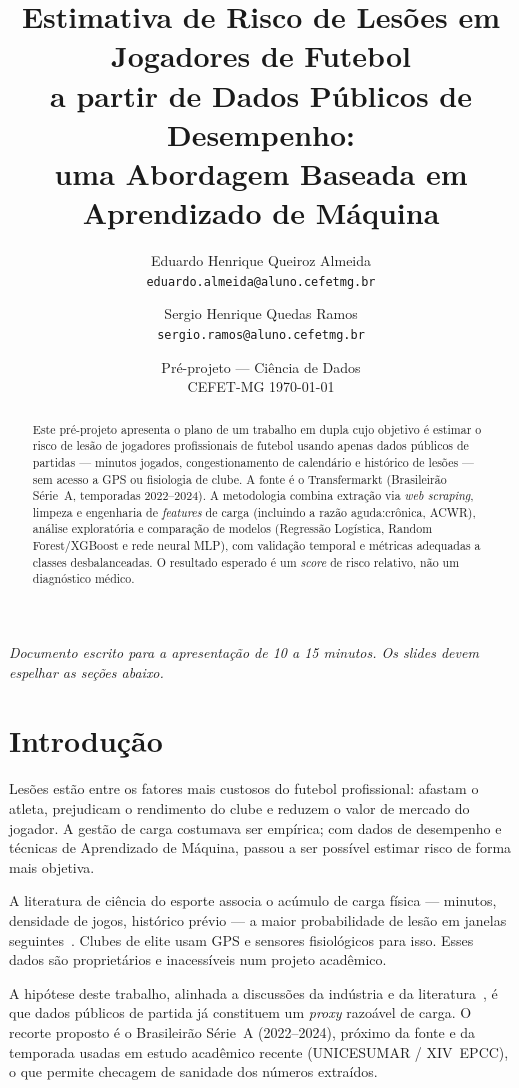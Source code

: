\documentclass[11pt,a4paper]{article}
\title{Estimativa de Risco de Lesões em Jogadores de Futebol\\
a partir de Dados Públicos de Desempenho:\\
uma Abordagem Baseada em Aprendizado de Máquina}
\author{Eduardo Henrique Queiroz Almeida\\
\texttt{eduardo.almeida@aluno.cefetmg.br}
\and
Sergio Henrique Quedas Ramos\\
\texttt{sergio.ramos@aluno.cefetmg.br}}
\date{Pré-projeto --- Ciência de Dados\\
CEFET-MG \quad \today}
\begin{document}
\maketitle

\begin{abstract}
\noindent
Este pré-projeto apresenta o plano de um trabalho em dupla cujo objetivo é estimar o risco de lesão de jogadores profissionais de futebol usando apenas dados públicos de partidas --- minutos jogados, congestionamento de calendário e histórico de lesões --- sem acesso a GPS ou fisiologia de clube. A fonte é o Transfermarkt (Brasileirão Série~A, temporadas 2022--2024). A metodologia combina extração via \textit{web scraping}, limpeza e engenharia de \textit{features} de carga (incluindo a razão aguda:crônica, ACWR), análise exploratória e comparação de modelos (Regressão Logística, Random Forest/XGBoost e rede neural MLP), com validação temporal e métricas adequadas a classes desbalanceadas. O resultado esperado é um \textit{score} de risco relativo, não um diagnóstico médico.
\end{abstract}

\tableofcontents
\vspace{1em}
\noindent\textit{Documento escrito para a apresentação de 10 a 15 minutos. Os slides devem espelhar as seções abaixo.}

\section{Introdução}

Lesões estão entre os fatores mais custosos do futebol profissional: afastam o atleta, prejudicam o rendimento do clube e reduzem o valor de mercado do jogador. A gestão de carga costumava ser empírica; com dados de desempenho e técnicas de Aprendizado de Máquina, passou a ser possível estimar risco de forma mais objetiva.

A literatura de ciência do esporte associa o acúmulo de carga física --- minutos, densidade de jogos, histórico prévio --- a maior probabilidade de lesão em janelas seguintes~\cite{rossi2022,applsci2024}. Clubes de elite usam GPS e sensores fisiológicos para isso. Esses dados são proprietários e inacessíveis num projeto acadêmico.

A hipótese deste trabalho, alinhada a discussões da indústria e da literatura~\cite{sportmonks}, é que dados públicos de partida já constituem um \textit{proxy} razoável de carga. O recorte proposto é o Brasileirão Série~A (2022--2024), próximo da fonte e da temporada usadas em estudo acadêmico recente (UNICESUMAR / XIV~EPCC), o que permite checagem de sanidade dos números extraídos.
\end{document}
